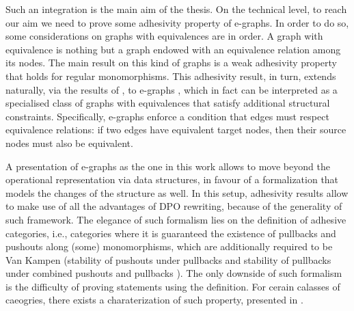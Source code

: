 Such an integration is the main aim of the thesis.
 On the technical level, to reach our aim we need to prove some adhesivity property of e-graphs. 
 In order to do so, some considerations on graphs with equivalences are in order. 
 A graph with equivalence is nothing but a graph endowed with an equivalence relation among its nodes. 
 The main result on this kind of graphs is a weak adhesivity property that holds for regular monomorphisms. 
%
%
%
This adhesivity result, in turn, extends naturally, via the results of \cite{castelnovo2022newcriterionmathcalmmathcalnadhesivity}, to e-graphs , which in fact can be interpreted as a specialised class of graphs with equivalences that satisfy additional structural constraints. Specifically, e-graphs enforce a condition that edges must respect equivalence relations: if two edges have equivalent target nodes, then their source nodes must also be equivalent.

\iffalse 
A presentation of e-graphs as the one in this work allows to move beyond the operational representation via data structures, in favour of a formalization that models the changes of the structure as well.
In this setup, adhesivity results allow to make use of all the advantages of DPO rewriting, because of the generality of such framework.
The elegance of such formalism lies on the definition of adhesive categories, i.e., categories where it is guaranteed the existence of pullbacks and pushouts along (some) monomorphisms, which are additionally required to be Van Kampen (stability of pushouts under pullbacks and stability of pullbacks under combined pushouts and pullbacks \cite{Ehrig_Golas}).
The only downside of such formalism is the difficulty of proving statements using the definition. 
For cerain calasses of caeogries, there exists a charaterization of such property, presented in \cite{castelnovo2022newcriterionmathcalmmathcalnadhesivity}.


